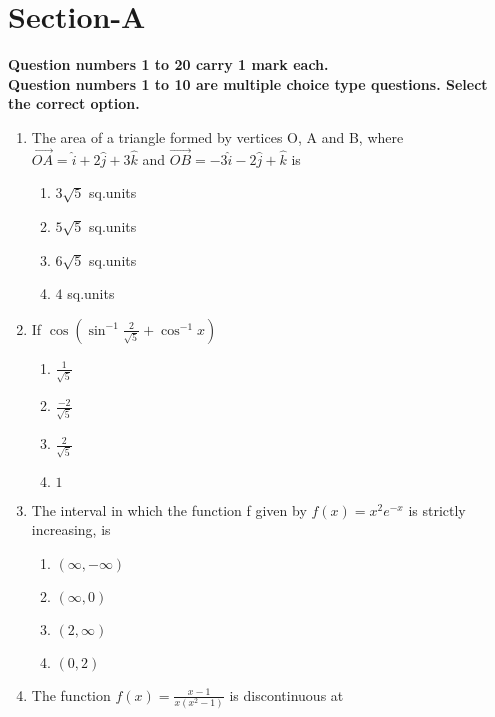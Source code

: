 \documentclass[journal,12pt,twocolumn]{IEEEtran}
\renewcommand\thesection{\arabic{section}}
\begin{document}
\section{Section-A}
\textbf{Question numbers 1 to 20 carry 1 mark each.} \\
\textbf{Question numbers 1 to 10 are multiple choice type questions. Select the correct option.} \\
\renewcommand{\theequation}{\theenumi}
\begin{enumerate}[label=\thesection.\arabic*.,ref=\thesection.\theenumi]
\item The area of a triangle formed by vertices O, A and B, where $\overrightarrow{OA}=\hat{i} + 2\hat{j} + 3 \hat{k} $ and $\overrightarrow{OB}=-3\hat{i} - 2\hat{j} +  \hat{k} $ is \\
 \begin{enumerate}
     \item $ 3\sqrt{5} $ sq.units\\
    \item$ 5\sqrt{5} $ sq.units\\
    \item$ 6\sqrt{5} $ sq.units\\
    \item$ 4 $ sq.units
\end{enumerate}

\item If $\cos (\sin^{-1} \frac{2}{\sqrt 5} + \cos^{-1} x)$ 

\begin{enumerate}
   \item $\frac{1}{\sqrt5}$\\
   \item $ \frac{-2}{\sqrt5}$\\
    \item $ \frac{2}{\sqrt5}$\\
    \item $1$
\end{enumerate}

\item The interval in which the function f given by $ f({x}) = x^2e^{-x} $ is strictly increasing,  is

\begin{enumerate}
    \item $\left(\infty , -\infty \right)$
    \item $\left(\infty , 0 \right)$
    \item $\left(2 , \infty \right)$
    \item $\left(0 , 2 \right)$
\end{enumerate}
\item The function $ f\left({x} \right) = \frac{x-1}{x\left(x^2 -1 \right)} $ is discontinuous at


\end{enumerate}
\end{document}
